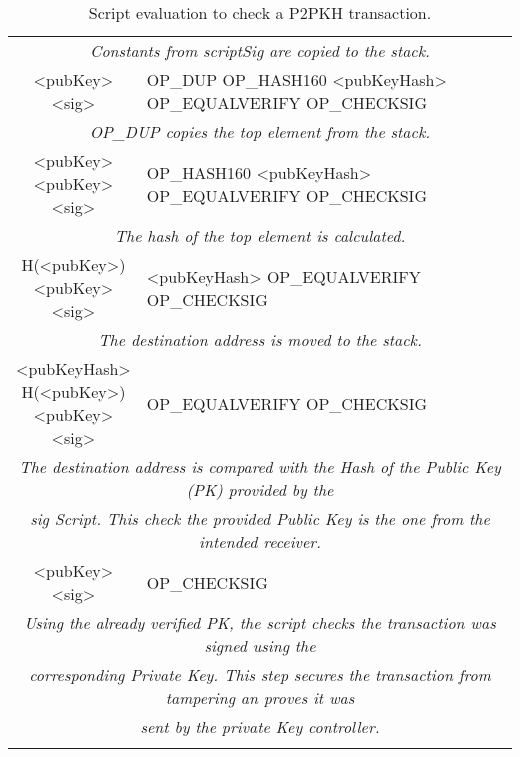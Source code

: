 	\begin{table}[]
		\small
		\caption{Script evaluation to check a P2PKH transaction.}
		\label{tab:p2pkh_exec}
		\begin{tabularx}{\textwidth}{| c | X |}
			\hline
				\thead{Stack} & \thead{Script} \\
			\hline
			\multicolumn{2}{|c|}{\textit{Constants from scriptSig are copied to the stack.}} \\
			\hline
			\makecell{<pubKey>\\<sig>} & OP\_DUP \footnotesize{OP\_HASH160 <pubKeyHash> OP\_EQUALVERIFY OP\_CHECKSIG} \\
			\hline
			\multicolumn{2}{|c|}{\textit{OP\_DUP copies the top element from the stack.}} \\
			\hline
			\makecell{<pubKey> \\ <pubKey> \\ <sig>} & OP\_HASH160 \footnotesize{<pubKeyHash> OP\_EQUALVERIFY OP\_CHECKSIG} \\
			\hline
			\multicolumn{2}{|c|}{\textit{The hash of the top element is calculated.}} \\
			\hline
			\makecell{H(<pubKey>) \\ <pubKey> \\ <sig>} & <pubKeyHash> \footnotesize{OP\_EQUALVERIFY OP\_CHECKSIG} \\
			\hline
			\multicolumn{2}{|c|}{\textit{The destination address is moved to the stack.}} \\
			\hline
			\makecell{<pubKeyHash> \\ H(<pubKey>) \\ <pubKey> \\ <sig>} & OP\_EQUALVERIFY \footnotesize{OP\_CHECKSIG} \\
			\hline
			\multicolumn{2}{|c|}{\textit{The destination address is compared with the Hash of the Public Key (PK) provided by the}} \\
			\multicolumn{2}{|c|}{\textit{sig Script. This check the provided Public Key is the one from the intended receiver.}} \\
			\hline
			\makecell{<pubKey> \\ <sig>} & OP\_CHECKSIG \\
			\hline
			\multicolumn{2}{|c|}{\textit{Using the already verified PK, the script checks the transaction was signed using the}} \\
			\multicolumn{2}{|c|}{\textit{corresponding Private Key. This step secures the transaction from tampering an proves it was}} \\
			\multicolumn{2}{|c|}{\textit{sent by the private Key controller.}} \\
			\hline
			\makecell{True} & \\
			\hline
		\end{tabularx}
	\end{table}

